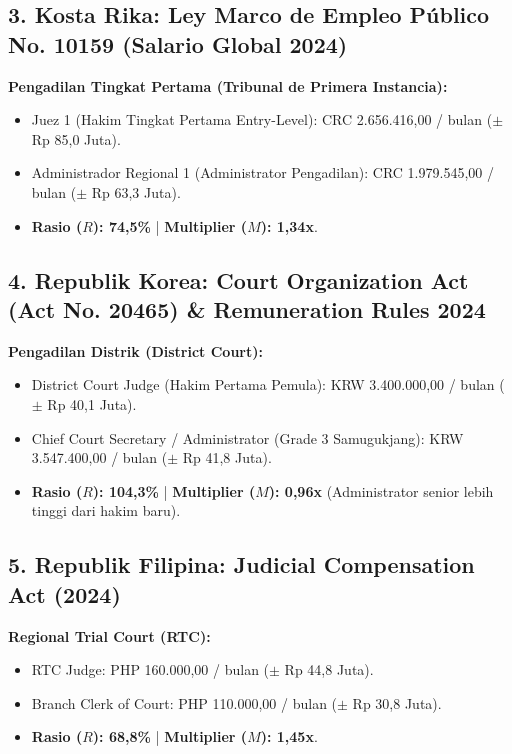 \documentclass[12pt, a4paper]{article}
\begin{document}
\subsection*{3. Kosta Rika: Ley Marco de Empleo Público No. 10159 (Salario Global 2024)}
\noindent\textbf{Pengadilan Tingkat Pertama (Tribunal de Primera Instancia):}
\begin{itemize}
    \item Juez 1 (Hakim Tingkat Pertama Entry-Level): CRC 2.656.416,00 / bulan ($\pm$ Rp 85,0 Juta).
    \item Administrador Regional 1 (Administrator Pengadilan): CRC 1.979.545,00 / bulan ($\pm$ Rp 63,3 Juta).
    \item \textbf{Rasio ($R$): 74,5\%} | \textbf{Multiplier ($M$): 1,34x}.
\end{itemize}

\subsection*{4. Republik Korea: Court Organization Act (Act No. 20465) \& Remuneration Rules 2024}
\noindent\textbf{Pengadilan Distrik (District Court):}
\begin{itemize}
    \item District Court Judge (Hakim Pertama Pemula): KRW 3.400.000,00 / bulan ($\pm$ Rp 40,1 Juta).
    \item Chief Court Secretary / Administrator (Grade 3 Samugukjang): KRW 3.547.400,00 / bulan ($\pm$ Rp 41,8 Juta).
    \item \textbf{Rasio ($R$): 104,3\%} | \textbf{Multiplier ($M$): 0,96x} (Administrator senior lebih tinggi dari hakim baru).
\end{itemize}

\subsection*{5. Republik Filipina: Judicial Compensation Act (2024)}
\noindent\textbf{Regional Trial Court (RTC):}
\begin{itemize}
    \item RTC Judge: PHP 160.000,00 / bulan ($\pm$ Rp 44,8 Juta).
    \item Branch Clerk of Court: PHP 110.000,00 / bulan ($\pm$ Rp 30,8 Juta).
    \item \textbf{Rasio ($R$): 68,8\%} | \textbf{Multiplier ($M$): 1,45x}.
\end{itemize}
\end{document}
